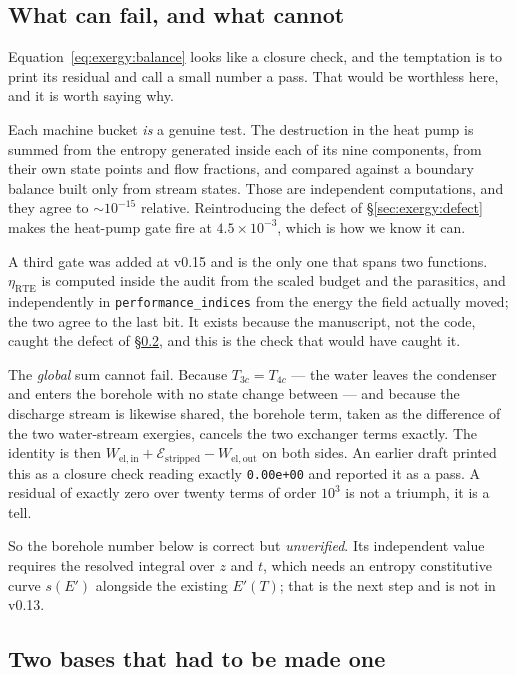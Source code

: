 \subsection{What can fail, and what cannot}
\label{sec:exergy:gates}

Equation~\eqref{eq:exergy:balance} looks like a closure check, and the
temptation is to print its residual and call a small number a pass. That
would be worthless here, and it is worth saying why.

Each machine bucket \emph{is} a genuine test. The destruction in the heat
pump is summed from the entropy generated inside each of its nine components,
from their own state points and flow fractions, and compared against a
boundary balance built only from stream states. Those are independent
computations, and they agree to $\sim\!10^{-15}$ relative. Reintroducing the
defect of \S\ref{sec:exergy:defect} makes the heat-pump gate fire at
$4.5\times10^{-3}$, which is how we know it can.

A third gate was added at v0.15 and is the only one that spans two functions.
$\eta_{\mathrm{RTE}}$ is computed inside the audit from the scaled budget and
the parasitics, and independently in \texttt{performance\_indices} from the
energy the field actually moved; the two agree to the last bit. It exists
because the manuscript, not the code, caught the defect of
\S\ref{sec:exergy:basis}, and this is the check that would have caught it.

The \emph{global} sum cannot fail. Because $T_{3c} = T_{4c}$ --- the water
leaves the condenser and enters the borehole with no state change between ---
and because the discharge stream is likewise shared, the borehole term, taken
as the difference of the two water-stream exergies, cancels the two exchanger
terms exactly. The identity is then $W_{\mathrm{el,in}} +
\mathcal{E}_{\mathrm{stripped}} - W_{\mathrm{el,out}}$ on both sides. An
earlier draft printed this as a closure check reading exactly
\texttt{0.00e+00} and reported it as a pass. A residual of exactly zero over
twenty terms of order $10^{3}$ is not a triumph, it is a tell.

So the borehole number below is correct but \emph{unverified}. Its independent
value requires the resolved integral over $z$ and $t$, which needs an entropy
constitutive curve $s(E')$ alongside the existing $E'(T)$; that is the next
step and is not in v0.13.

\subsection{Two bases that had to be made one}
\label{sec:exergy:basis}

